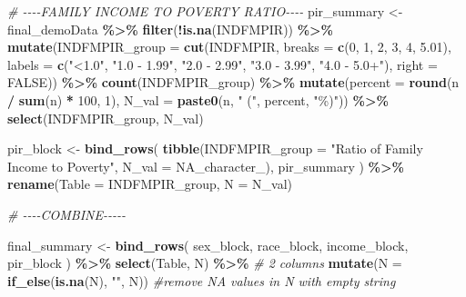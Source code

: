 \documentclass[
]{article}
\newenvironment{Shaded}{\begin{snugshade}}{\end{snugshade}}
\newcommand{\AttributeTok}[1]{\textcolor[rgb]{0.13,0.29,0.53}{#1}}
\newcommand{\CommentTok}[1]{\textcolor[rgb]{0.56,0.35,0.01}{\textit{#1}}}
\newcommand{\ConstantTok}[1]{\textcolor[rgb]{0.56,0.35,0.01}{#1}}
\newcommand{\DecValTok}[1]{\textcolor[rgb]{0.00,0.00,0.81}{#1}}
\newcommand{\FloatTok}[1]{\textcolor[rgb]{0.00,0.00,0.81}{#1}}
\newcommand{\FunctionTok}[1]{\textcolor[rgb]{0.13,0.29,0.53}{\textbf{#1}}}
\newcommand{\NormalTok}[1]{#1}
\newcommand{\OtherTok}[1]{\textcolor[rgb]{0.56,0.35,0.01}{#1}}
\newcommand{\SpecialCharTok}[1]{\textcolor[rgb]{0.81,0.36,0.00}{\textbf{#1}}}
\newcommand{\StringTok}[1]{\textcolor[rgb]{0.31,0.60,0.02}{#1}}
\begin{document}
\begin{Shaded}
\begin{Highlighting}[]
\CommentTok{\# {-}{-}{-}{-}FAMILY INCOME TO POVERTY RATIO{-}{-}{-}{-}}
\NormalTok{pir\_summary }\OtherTok{\textless{}{-}}\NormalTok{ final\_demoData }\SpecialCharTok{\%\textgreater{}\%}
  \FunctionTok{filter}\NormalTok{(}\SpecialCharTok{!}\FunctionTok{is.na}\NormalTok{(INDFMPIR)) }\SpecialCharTok{\%\textgreater{}\%}
  \FunctionTok{mutate}\NormalTok{(}\AttributeTok{INDFMPIR\_group =} \FunctionTok{cut}\NormalTok{(INDFMPIR,}
                              \AttributeTok{breaks =} \FunctionTok{c}\NormalTok{(}\DecValTok{0}\NormalTok{, }\DecValTok{1}\NormalTok{, }\DecValTok{2}\NormalTok{, }\DecValTok{3}\NormalTok{, }\DecValTok{4}\NormalTok{, }\FloatTok{5.01}\NormalTok{),}
                              \AttributeTok{labels =} \FunctionTok{c}\NormalTok{(}\StringTok{"\textless{}1.0"}\NormalTok{, }\StringTok{"1.0 {-} 1.99"}\NormalTok{, }\StringTok{"2.0 {-} 2.99"}\NormalTok{, }\StringTok{"3.0 {-} 3.99"}\NormalTok{, }\StringTok{"4.0 {-} 5.0+"}\NormalTok{),}
                              \AttributeTok{right =} \ConstantTok{FALSE}\NormalTok{)) }\SpecialCharTok{\%\textgreater{}\%}
  \FunctionTok{count}\NormalTok{(INDFMPIR\_group) }\SpecialCharTok{\%\textgreater{}\%}
  \FunctionTok{mutate}\NormalTok{(}\AttributeTok{percent =} \FunctionTok{round}\NormalTok{(n }\SpecialCharTok{/} \FunctionTok{sum}\NormalTok{(n) }\SpecialCharTok{*} \DecValTok{100}\NormalTok{, }\DecValTok{1}\NormalTok{),}
         \AttributeTok{N\_val =} \FunctionTok{paste0}\NormalTok{(n, }\StringTok{" ("}\NormalTok{, percent, }\StringTok{"\%)"}\NormalTok{)) }\SpecialCharTok{\%\textgreater{}\%}
  \FunctionTok{select}\NormalTok{(INDFMPIR\_group, N\_val)}

\NormalTok{pir\_block }\OtherTok{\textless{}{-}} \FunctionTok{bind\_rows}\NormalTok{(}
  \FunctionTok{tibble}\NormalTok{(}\AttributeTok{INDFMPIR\_group =} \StringTok{"Ratio of Family Income to Poverty"}\NormalTok{, }\AttributeTok{N\_val =} \ConstantTok{NA\_character\_}\NormalTok{),}
\NormalTok{  pir\_summary}
\NormalTok{) }\SpecialCharTok{\%\textgreater{}\%} \FunctionTok{rename}\NormalTok{(}\AttributeTok{Table =}\NormalTok{ INDFMPIR\_group, }\AttributeTok{N =}\NormalTok{ N\_val)}

\CommentTok{\# {-}{-}{-}{-}COMBINE{-}{-}{-}{-}{-}}

\NormalTok{final\_summary }\OtherTok{\textless{}{-}} \FunctionTok{bind\_rows}\NormalTok{(}
\NormalTok{  sex\_block,}
\NormalTok{  race\_block,}
\NormalTok{  income\_block,}
\NormalTok{  pir\_block}
\NormalTok{) }\SpecialCharTok{\%\textgreater{}\%}
  \FunctionTok{select}\NormalTok{(Table, N) }\SpecialCharTok{\%\textgreater{}\%} \CommentTok{\# 2 columns}
  \FunctionTok{mutate}\NormalTok{(}\AttributeTok{N =} \FunctionTok{if\_else}\NormalTok{(}\FunctionTok{is.na}\NormalTok{(N), }\StringTok{""}\NormalTok{, N)) }\CommentTok{\#remove NA values in N with empty string}


\end{Highlighting}
\end{Shaded}
\end{document}
